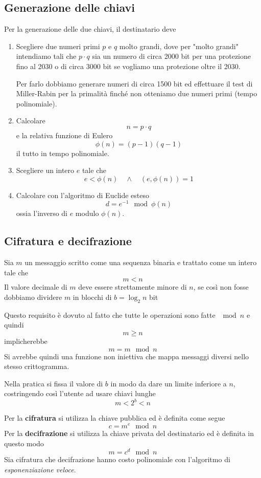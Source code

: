\subsection{Generazione delle chiavi}
Per la generazione delle due chiavi, il destinatario deve
\begin{enumerate}
	\item Scegliere due numeri primi $p$ e $q$ molto grandi, dove per "molto grandi" intendiamo tali che $p \cdot q$
	      sia un numero di circa 2000 bit per una protezione fino al 2030 o di circa 3000 bit se vogliamo una
	      protezione oltre il 2030.

	      Per farlo dobbiamo generare numeri di circa 1500 bit ed effettuare il test di Miller-Rabin per la
	      primalit\`a finch\'e non otteniamo due numeri primi (tempo polinomiale).
	\item Calcolare
	      \[ n = p \cdot q \]
	      e la relativa funzione di Eulero
	      \[ \phi(n) = (p - 1)(q - 1) \]
	      il tutto in tempo polinomiale.
	\item Scegliere un intero $e$ tale che
	      \[ e < \phi(n) \quad \wedge \quad (e, \phi(n)) = 1 \]
	\item Calcolare con l'algoritmo di Euclide esteso
	      \[ d = e^{-1} \mod{\phi(n)} \]
	      ossia l'inverso di $e$ modulo $\phi(n)$.
\end{enumerate}

\subsection{Cifratura e decifrazione}
Sia $m$ un messaggio scritto come una sequenza binaria e trattato come un intero tale che
\[ m < n \]
Il valore decimale di $m$ deve essere strettamente minore di $n$, se cos\`i non fosse dobbiamo dividere $m$ in
blocchi di $b = \log_2 n$ bit

Questo requisito \`e dovuto al fatto che tutte le operazioni sono fatte $\mod{n}$ e quindi
\[ m \geq n \]
implicherebbe
\[ m = m \mod{n} \]
Si avrebbe quindi una funzione non iniettiva che mappa messaggi diversi nello stesso crittogramma.

Nella pratica si fissa il valore di $b$ in modo da dare un limite inferiore a $n$, costringendo cos\`i l'utente ad usare
chiavi lunghe
\[ m < 2^b < n \]

Per la \textbf{cifratura} si utilizza la chiave pubblica ed \`e definita come segue
\[ c = m^e \mod{n} \]
Per la \textbf{decifrazione} si utilizza la chiave privata del destinatario ed \`e definita in questo modo
\[ m = c^d \mod{n} \]
Sia cifratura che decifrazione hanno costo polinomiale con l'algoritmo di \emph{esponenziazione veloce}.

